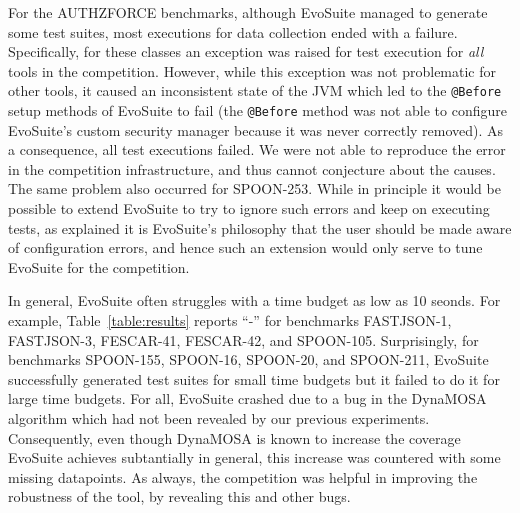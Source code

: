 \documentclass[sigconf,table]{acmart}
\newcommand{\TODO}[1]{\textbf{\textcolor{ScarletRed}{[TODO: #1]}}\xspace}
\newcommand{\TODO}[1]{}
\newcommand{\EVOSUITE}{{\sc EvoSuite}\xspace}
\begin{document}
For the AUTHZFORCE benchmarks, although \EVOSUITE managed to generate
some test suites, most executions for data collection ended with a
failure. Specifically, for these classes an exception was raised for
test execution for \emph{all} tools in the competition. However,
while this exception was not problematic for other tools, it caused
an inconsistent state of the JVM which led to the \texttt{@Before}
setup methods of \EVOSUITE to fail (the \texttt{@Before} method was
not able to configure \EVOSUITE's custom security manager because it
was never correctly removed). As a consequence, all test executions
failed. We were not able to reproduce the error in the competition
infrastructure, and thus cannot conjecture about the causes. The same
problem also occurred for SPOON-253. While in principle it would be
possible to extend \EVOSUITE to try to ignore such errors and keep on
executing tests, as explained it is \EVOSUITE's philosophy that the
user should be made aware of configuration errors, and hence such an
extension would only serve to tune \EVOSUITE for the competition.

In general, \EVOSUITE often struggles with a time budget as low as 10
seonds. For example, Table~\ref{table:results} reports ``-'' for
benchmarks FASTJSON-1, FASTJSON-3, FESCAR-41, FESCAR-42, and
SPOON-105.
%
Surprisingly, for benchmarks SPOON-155, SPOON-16, SPOON-20, and
SPOON-211, \EVOSUITE successfully generated test suites for small
time budgets but it failed to do it for large time budgets. For all,
\EVOSUITE crashed due to a bug in the DynaMOSA algorithm which had
not been revealed by our previous experiments. Consequently, even
though DynaMOSA is known to increase the coverage \EVOSUITE achieves
subtantially in general, this increase was countered with some
missing datapoints. As always, the competition was helpful in
improving the robustness of the tool, by revealing this and other
bugs.
\end{document}
